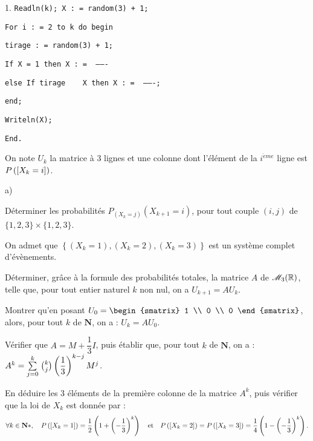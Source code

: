 \documentclass[11pt]{article}%
\begin{document}
\begin{noliste}{1.}
\texttt{\hspace*{1cm}Readln(k);\ X : = random(3) + 1;}

\texttt{\hspace*{1cm}For\ i : = 2\ to\ k\ do\ begin}

\texttt{\hspace*{2cm}tirage : = random(3) + 1;}

\texttt{\hspace*{2cm}If\ X = 1\ then\ X : = \ -------}

\texttt{\hspace*{2cm}else\ If\ tirage\ \ < > \ X\
then\ X : = \ -------;}

\texttt{\hspace*{1cm}end;}

\texttt{\hspace*{1cm}Writeln(X);}

\texttt{End.}

\item On note $U_{k}$ la matrice à $3$ lignes et une colonne dont
l'élément
de la $i^{\grave{e}me}$ ligne est $P\left(\left[ {X_{k} = i} \right]\right)$.

\begin{noliste}{a)}
 \setlength{\itemsep}{2mm}
\item Déterminer les probabilités $P_{(X_{k} = j)}(X_{k + 1} = i)$,
pour tout
couple $(i,j)$ de $\{1,2,3\}\times \{1,2,3\}$.

\item On admet que $\left\{ (X_{k} = 1),(X_{k} = 2),(X_{k} = 3)\right\}
$ est un
système complet d'évènements.

Déterminer, grâce à la formule des probabilités totales, la matrice $A$
de $\mathscr{M}_{3}(\mathbb{R})$, telle que, pour tout entier naturel $k$ non
nul, on a $U_{k + 1} = AU_{k}$.

\item Montrer qu'en posant $U_{0} = 
\begin{smatrix}
1 \\
0 \\
0
\end{smatrix}
$, alors, pour tout $k$ de ${\mathbf{N}}$, on a : $U_{k} = AU_{0}$.

\item 
Vérifier que $A = M + \dfrac{1}{3}I$, puis établir que, pour tout $k$
de ${\mathbf{N}}$, on a : $A^{k} = {\textstyle\sum\limits_{j = 0}^{k}}\hspace{.1cm}\binom{k}{j}\left( 
\dfrac{1}{3}\right) ^{k-j}M^{j}$.

\item En déduire les $3$ éléments de la première colonne de la matrice
$A^{k}
$, puis vérifier que la loi de $X_{k}$ est donnée par : 
\[
\forall k\in {\mathbf{N}}{\ast },\quad P\left(\left[ {X_{k} = 1} \right]\right) =
\frac{1}{2}\left(
1 + \left( -\dfrac{1}{3}\right) ^{k}\right) \quad \text{et}\quad
P\left(\left[ {X_{k} = 2} \right]\right) = P\left(\left[ {X_{k} = 3} \right]\right) =
\frac{1}{4}\left( 1-\left( -\dfrac{1}{3}\right)
^{k}\right).
\]


\end{noliste}
\end{noliste}
\end{document}
